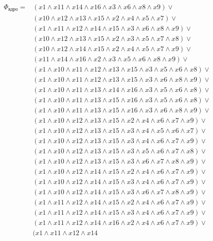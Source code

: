 \documentclass{article}
\begin{document}
\begin{enumerate}
\begin{figure}[ht]
  \label{fig:6_mdm}
\end{figure}
\begin{equation*}
\begin{aligned}
\Phi_{\text{ядро}} = & (x1 \land x11 \land x14 \land x16 \land x3 \land x6 \land x8 \land x9) \lor \\
& (x10 \land x12 \land x13 \land x15 \land x2 \land x4 \land x5 \land x7) \lor \\ & (x1 \land x11 \land x12 \land x14 \land x15 \land x3 \land x6 \land x8 \land x9) \lor \\ & (x10 \land x12 \land x13 \land x15 \land x2 \land x3 \land x5 \land x7 \land x8) \lor \\ & (x10 \land x12 \land x14 \land x15 \land x2 \land x4 \land x5 \land x7 \land x9) \lor \\ & (x11 \land x14 \land x16 \land x2 \land x3 \land x5 \land x6 \land x8 \land x9) \lor \\ & (x1 \land x10 \land x11 \land x12 \land x13 \land x15 \land x3 \land x5 \land x6 \land x8) \lor \\ & (x1 \land x10 \land x11 \land x12 \land x13 \land x15 \land x3 \land x6 \land x8 \land x9) \lor \\ & (x1 \land x10 \land x11 \land x13 \land x14 \land x16 \land x3 \land x5 \land x6 \land x8) \lor \\ & (x1 \land x10 \land x11 \land x13 \land x15 \land x16 \land x3 \land x5 \land x6 \land x8) \lor \\ & (x1 \land x10 \land x11 \land x13 \land x15 \land x16 \land x3 \land x6 \land x8 \land x9) \lor \\ & (x1 \land x10 \land x12 \land x13 \land x15 \land x2 \land x4 \land x6 \land x7 \land x9) \lor \\ & (x1 \land x10 \land x12 \land x13 \land x15 \land x3 \land x4 \land x5 \land x6 \land x7) \lor \\ & (x1 \land x10 \land x12 \land x13 \land x15 \land x3 \land x4 \land x6 \land x7 \land x9) \lor \\ & (x1 \land x10 \land x12 \land x13 \land x15 \land x3 \land x5 \land x6 \land x7 \land x8) \lor \\ & (x1 \land x10 \land x12 \land x13 \land x15 \land x3 \land x6 \land x7 \land x8 \land x9) \lor \\ & (x1 \land x10 \land x12 \land x14 \land x15 \land x2 \land x4 \land x6 \land x7 \land x9) \lor \\ & (x1 \land x10 \land x12 \land x14 \land x15 \land x3 \land x4 \land x6 \land x7 \land x9) \lor \\ & (x1 \land x10 \land x12 \land x14 \land x15 \land x3 \land x6 \land x7 \land x8 \land x9) \lor \\ & (x1 \land x11 \land x12 \land x14 \land x15 \land x2 \land x4 \land x6 \land x7 \land x9) \lor \\ & (x1 \land x11 \land x12 \land x14 \land x15 \land x3 \land x4 \land x6 \land x7 \land x9) \lor \\ & (x1 \land x11 \land x12 \land x14 \land x16 \land x2 \land x4 \land x6 \land x7 \land x9) \lor \\ & (x1 \land x11 \land x12 \land x14 
\end{aligned}
\end{equation*}
\end{enumerate}
\end{document}
